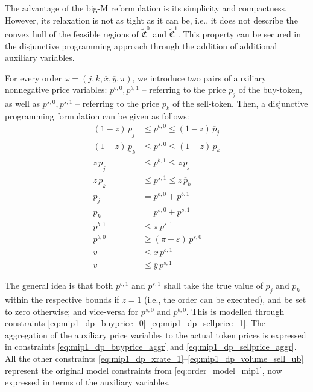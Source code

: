 \documentclass[11pt,parskip=full]{scrartcl}%
\newcommand*{\ie}{i.e., }
\begin{document}
The advantage of the big-M reformulation is its simplicity and compactness.
However, its relaxation is not as tight as it can be, \ie it does not describe the convex hull of
the feasible regions of $ \tilde{\mathfrak{C}}^0 $ and $ \tilde{\mathfrak{C}}^1 $.
This property can be secured in the disjunctive programming approach through the addition of
additional auxiliary variables.

For every order $ \omega = (j,k,\overline{x},\overline{y},\pi) $, we introduce two pairs of
auxiliary nonnegative price variables:
$ p^{b,0}, p^{b,1} $ -- referring to the price $ p_j $ of the buy-token, as well as
$ p^{s,0}, p^{s,1} $ -- referring to the price $ p_k $ of the sell-token.
Then, a disjunctive programming formulation can be given as follows:
\begin{subequations}
\begin{align}
  (1-z) \, \underline{p}_j &\le p^{b,0} \le (1-z) \, \overline{p}_j
    \label{eq:mip1_dp_buyprice_0}\\
  (1-z) \, \underline{p}_k &\le p^{s,0} \le (1-z) \, \overline{p}_k
    \label{eq:mip1_dp_sellprice_0}\\[2mm]
  z \, \underline{p}_j &\le p^{b,1} \le z \, \overline{p}_j
    \label{eq:mip1_dp_buyprice_1}\\
  z \, \underline{p}_k &\le p^{s,1} \le z \, \overline{p}_k
    \label{eq:mip1_dp_sellprice_1}\\[2mm]
  p_j &= p^{b,0} + p^{b,1}
    \label{eq:mip1_dp_buyprice_aggr}\\
  p_k &= p^{s,0} + p^{s,1}
    \label{eq:mip1_dp_sellprice_aggr}\\[2mm]
  p^{b,1} &\le \pi \, p^{s,1}
    \label{eq:mip1_dp_xrate_1}\\
  p^{b,0} &\ge (\pi+\varepsilon) \, p^{s,0}
    \label{eq:mip1_dp_xrate_0}\\[2mm]
  v &\le \overline{x} \, p^{b,1}
    \label{eq:mip1_dp_volume_buy_ub}\\
  v &\le \overline{y} \, p^{s,1}
    \label{eq:mip1_dp_volume_sell_ub}
\end{align}
\label{eq:order_model_mip1_DP}
\end{subequations}

The general idea is that both $p^{b,1}$ and $p^{s,1}$ shall take the true value of $p_j$ and
$p_k$ within the respective bounds if $z=1$ (\ie the order can be executed), and be set to
zero otherwise; and vice-versa for $p^{s,0}$ and $p^{b,0}$.
This is modelled through constraints \eqref{eq:mip1_dp_buyprice_0}--\eqref{eq:mip1_dp_sellprice_1}.
The aggregation of the auxiliary price variables to the actual token prices is expressed in
constraints \eqref{eq:mip1_dp_buyprice_aggr} and \eqref{eq:mip1_dp_sellprice_aggr}.
All the other constraints \eqref{eq:mip1_dp_xrate_1}--\eqref{eq:mip1_dp_volume_sell_ub} represent
the original model constraints from \eqref{eq:order_model_mip1}, now expressed in terms of the
auxiliary variables.
\end{document}
